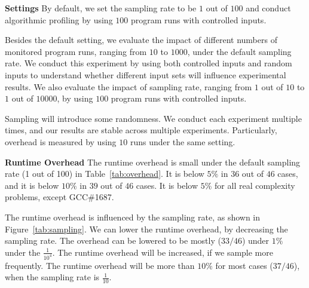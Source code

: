\noindent\textbf{Settings}
By default, we set the sampling rate to be $1$ out of $100$ 
and conduct algorithmic profiling by using $100$ program runs with controlled inputs.  

Besides the default setting,
we evaluate the impact of different numbers of monitored program runs, 
ranging from $10$ to $1000$, under the default sampling rate.
We conduct this experiment by using both controlled inputs and random inputs 
to understand whether different input sets will influence experimental results.
We also evaluate the impact of sampling rate, ranging from $1$ out of $10$ to $1$ out of $10000$, 
by using $100$ program runs with controlled inputs.  

Sampling will introduce some randomness. 
We conduct each experiment multiple times, 
and our results are stable across multiple experiments. 
Particularly, overhead is measured by using $10$ runs under the same setting. 

\noindent\textbf{Runtime Overhead}
The runtime overhead is small under the default sampling rate (1 out of 100) 
in Table~\ref{tab:overhead}.
It is below $5\%$ in $36$ out of $46$ cases, 
and it is below $10\%$ in $39$ out of $46$ cases. 
It is below $5\%$ for all real complexity problems, 
except GCC\#1687. 

The runtime overhead is influenced by the sampling rate, 
as shown in Figure~\ref{tab:sampling}.
We can lower the runtime overhead, by decreasing the sampling rate.
The overhead can be lowered to be mostly ($33/46$) 
under $1\%$ under the $\frac{1}{10^4}$.
The runtime overhead will be increased, 
if we sample more frequently.
The runtime overhead will be more than $10\%$ for most cases ($37/46$), 
when the sampling rate is $\frac{1}{10}$.



















%
%





